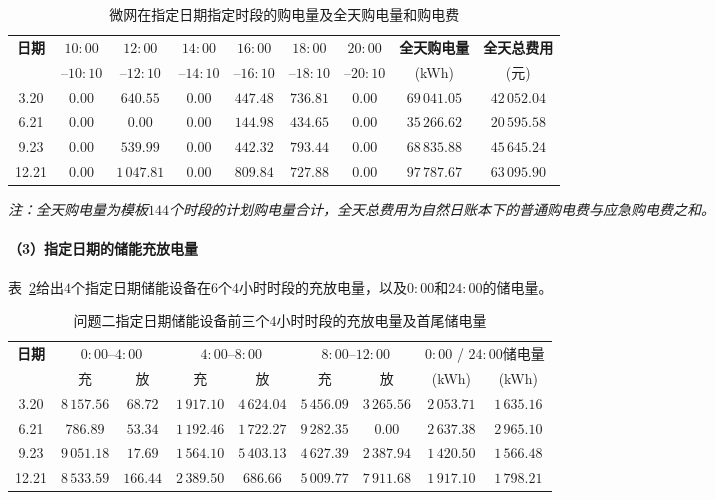 \documentclass[12pt,a4paper]{ctexart}
\theoremstyle{definition}
\theoremstyle{plain}
\theoremstyle{remark}
\begin{document}
\begin{table}[H]
\centering
\caption{微网在指定日期指定时段的购电量及全天购电量和购电费}
\label{tab:q2_specified_purchase}
\begin{tabular}{c|cccccc|cc}
\toprule
\textbf{日期} & $10{:}00$ & $12{:}00$ & $14{:}00$ & $16{:}00$ & $18{:}00$ & $20{:}00$ & \textbf{全天购电量} & \textbf{全天总费用} \\
 & --$10{:}10$ & --$12{:}10$ & --$14{:}10$ & --$16{:}10$ & --$18{:}10$ & --$20{:}10$ & (kWh) & (元) \\
\midrule
3.20 & $0.00$ & $640.55$ & $0.00$ & $447.48$ & $736.81$ & $0.00$ & $69\,041.05$ & $42\,052.04$ \\
6.21 & $0.00$ & $0.00$ & $0.00$ & $144.98$ & $434.65$ & $0.00$ & $35\,266.62$ & $20\,595.58$ \\
9.23 & $0.00$ & $539.99$ & $0.00$ & $442.32$ & $793.44$ & $0.00$ & $68\,835.88$ & $45\,645.24$ \\
12.21 & $0.00$ & $1\,047.81$ & $0.00$ & $809.84$ & $727.88$ & $0.00$ & $97\,787.67$ & $63\,095.90$ \\
\bottomrule
\end{tabular}
\end{table}

\noindent\textit{注：全天购电量为模板$144$个时段的计划购电量合计，全天总费用为自然日账本下的普通购电费与应急购电费之和。}

\paragraph{（3）指定日期的储能充放电量}

表~\ref{tab:q2_specified_storage}给出$4$个指定日期储能设备在$6$个$4$小时时段的充放电量，以及$0{:}00$和$24{:}00$的储电量。

\begin{table}[H]
\centering
\caption{问题二指定日期储能设备前三个$4$小时时段的充放电量及首尾储电量}
\label{tab:q2_specified_storage}
\begin{tabular}{c|cc|cc|cc|cc}
\toprule
\textbf{日期} & \multicolumn{2}{c|}{$0{:}00$--$4{:}00$} & \multicolumn{2}{c|}{$4{:}00$--$8{:}00$} & \multicolumn{2}{c|}{$8{:}00$--$12{:}00$} & \multicolumn{2}{c}{$0{:}00$ / $24{:}00$储电量} \\
 & 充 & 放 & 充 & 放 & 充 & 放 & (kWh) & (kWh) \\
\midrule
3.20 & $8\,157.56$ & $68.72$ & $1\,917.10$ & $4\,624.04$ & $5\,456.09$ & $3\,265.56$ & $2\,053.71$ & $1\,635.16$ \\
6.21 & $786.89$ & $53.34$ & $1\,192.46$ & $1\,722.27$ & $9\,282.35$ & $0.00$ & $2\,637.38$ & $2\,965.10$ \\
9.23 & $9\,051.18$ & $17.69$ & $1\,564.10$ & $5\,403.13$ & $4\,627.39$ & $2\,387.94$ & $1\,420.50$ & $1\,566.48$ \\
12.21 & $8\,533.59$ & $166.44$ & $2\,389.50$ & $686.66$ & $5\,009.77$ & $7\,911.68$ & $1\,917.10$ & $1\,798.21$ \\
\bottomrule
\end{tabular}
\end{table}
\end{document}

